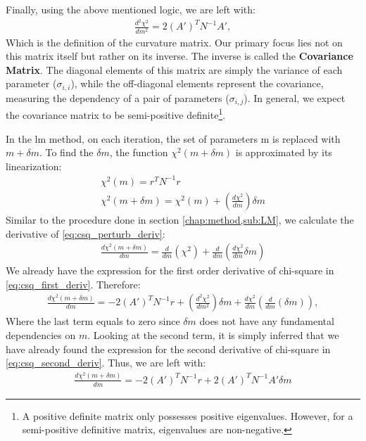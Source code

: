 \documentclass[%
 reprint,
 amsmath,amssymb,
 aps,
]{revtex4-2}
\begin{document}
Finally, using the above mentioned logic, we are left with:
\begin{align}
         \frac{d^2 \chi^2}{dm^2} = 2 \left(A'\right)^T N^{-1} A' ,\label{eq:csq_second_deriv}
\end{align}
Which is the definition of the curvature matrix. Our primary focus lies not on this matrix itself but rather on its inverse. The inverse is called the \textbf{Covariance Matrix}. The diagonal elements of this matrix are simply the variance of each parameter ($\sigma_{i, i}$), while the off-diagonal elements represent the covariance, measuring the dependency of a pair of parameters ($\sigma_{i, j}$). In general, we expect the covariance matrix to be semi-positive definite\footnote{A positive definite matrix only possesses positive eigenvalues. However, for a semi-positive definitive matrix, eigenvalues are non-negative.}.\par
In the \gls{lm} method, on each iteration, the set of parameters m is replaced with $m+\delta m$. To find the $\delta m$, the function $\chi^2 (m +\delta m)$ is approximated by its linearization: 
\begin{gather}
    \chi^2 \left(m\right) = r^T N^{-1} r\\
    \chi^2 \left(m + \delta m\right) =  \chi^2 \left(m\right) + \left(\frac{d \chi^2}{dm}\right) \delta m \label{eq:csq_perturb_deriv}
\end{gather}
Similar to the procedure done in section \ref{chap:method,sub:LM}, we calculate the derivative of \ref{eq:csq_perturb_deriv}:
\begin{gather}
    \frac{d \chi^2 \left(m +\delta m\right)}{dm} = \frac{d}{dm} \left(\chi^2\right) + \frac{d}{dm} \left(\frac{d\chi^2}{dm} \delta m\right)
\end{gather}
We already have the expression for the first order derivative of chi-square in \ref{eq:csq_first_deriv}. Therefore:
\begin{gather}
   \frac{d \chi^2 \left(m +\delta m\right)}{dm} =  -2 \left(A'\right)^T N^{-1} r + \left(\frac{d^2 \chi^2}{dm^2}\right) \delta m + \frac{d\chi^2}{dm} \left(\frac{d}{dm} (\delta m)\right),
\end{gather}
Where the last term equals to zero since $\delta m$ does not have any fundamental dependencies on $m$. Looking at the second term, it is simply inferred that we have already found the expression for the second derivative of chi-square in \ref{eq:csq_second_deriv}. Thus, we are left with:
\begin{gather}
    \frac{d \chi^2 (m +\delta m)}{dm} =  -2 \left(A'\right)^T N^{-1} r + 2 \left(A'\right)^T N^{-1} A'\delta m
\end{gather}
\end{document}
